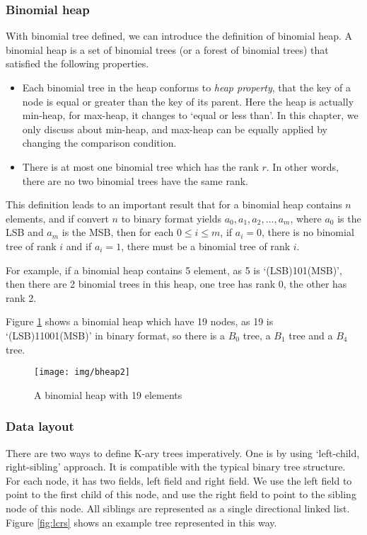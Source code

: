 \documentclass{article}
\begin{document}
\subsubsection{Binomial heap}
\label{Binomial heap} 

With binomial tree defined, we can introduce the definition of binomial heap. A binomial heap is a set of binomial trees (or a forest of binomial trees) that satisfied the following properties.

\begin{itemize}
\item Each binomial tree in the heap conforms to {\em heap property}, that the key of a node is equal or greater than the key of its parent. Here the heap is actually min-heap, for max-heap, it changes to `equal or less than'. In this chapter, we only discuss about min-heap, and max-heap can be equally applied by changing the comparison condition.
\item There is at most one binomial tree which has the rank $r$. In other words, there are no two binomial trees have the same rank.
\end{itemize}

This definition leads to an important result that for a binomial heap contains $n$ elements, and if convert $n$ to binary format yields $a_0, a_1, a_2, ..., a_m$, where $a_0$ is the LSB and $a_m$ is the MSB, then for each $0 \leq i \leq m$, if $a_i=0$, there is no binomial tree of rank $i$ and if $a_i = 1$, there must be a binomial tree of rank $i$.

For example, if a binomial heap contains 5 element, as 5 is `(LSB)101(MSB)', then there are 2 binomial trees in this heap, one tree has rank 0, the other has rank 2.

Figure \ref{fig:bheap2} shows a binomial heap which have 19 nodes, as 19 is `(LSB)11001(MSB)' in binary format, so there is a $B_0$ tree, a $B_1$ tree and a $B_4$ tree.

\begin{figure}[htbp]
  \centering
  \texttt{[image: img/bheap2]}
  \caption{A binomial heap with 19 elements} \label{fig:bheap2}
\end{figure}

\subsubsection{Data layout}
There are two ways to define K-ary trees imperatively. One is by using
`left-child, right-sibling' approach\cite{CLRS}. It is compatible with
the typical binary tree structure. For each node, it has two fields,
left field and right field. We use the left field to point to the first
child of this node, and use the right field to point to the sibling
node of this node. All siblings are represented as a single directional
linked list. Figure \ref{fig:lcrs} shows an example tree represented in this way.
\end{document}
